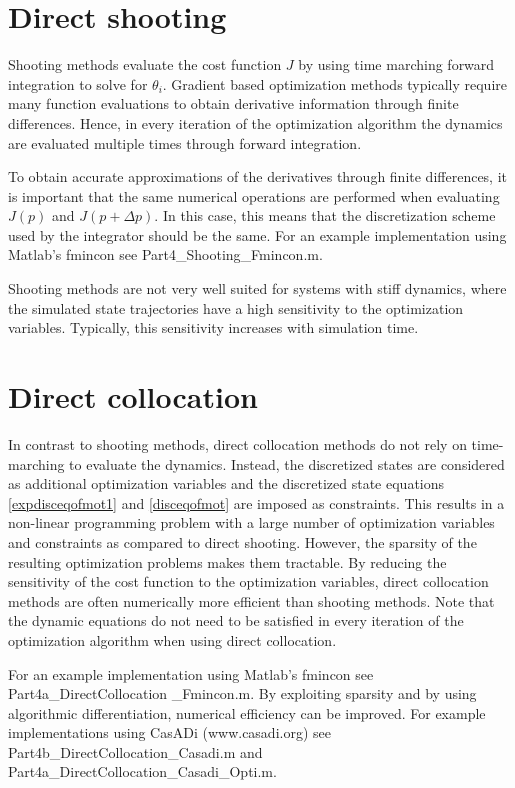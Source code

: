 \documentclass[
a4paper, %
11pt, %
onecolumn, %
openright, %
]{memoir}
\begin{document}
\section{Direct shooting}

Shooting methods evaluate the cost function $J$ by using time marching forward integration to solve for $\theta_i$. Gradient based optimization methods typically require many function evaluations to obtain derivative information through finite differences. Hence, in every iteration of the optimization algorithm the dynamics are evaluated multiple times through forward integration. 

To obtain accurate approximations of the derivatives through finite differences, it is important that the same numerical operations are performed when evaluating $J(p)$ and $J(p+\Delta p)$. In this case, this means that the discretization scheme used by the integrator should be the same. For an example implementation using Matlab's fmincon see Part4\_Shooting\_Fmincon.m.

Shooting methods are not very well suited for systems with stiff dynamics, where the simulated state trajectories have a high sensitivity to the optimization variables. Typically, this sensitivity increases with simulation time.

\section{Direct collocation}

In contrast to shooting methods, direct collocation methods do not rely on time-marching to evaluate the dynamics. Instead, the discretized states are considered as additional optimization variables and the discretized state equations \ref{expdisceqofmot1} and \ref{disceqofmot} are imposed as constraints. This results in a non-linear programming problem with a large number of optimization variables and constraints as compared to direct shooting. However, the sparsity of the resulting optimization problems makes them tractable. By reducing the sensitivity of the cost function to the optimization variables, direct collocation methods are often numerically more efficient than shooting methods. Note that the dynamic equations do not need to be satisfied in every iteration of the optimization algorithm when using direct collocation. 

For an example implementation using Matlab's fmincon see Part4a\_DirectCollocation  \_Fmincon.m. By exploiting sparsity and by using algorithmic differentiation, numerical efficiency can be improved. For example implementations using CasADi (www.casadi.org) see Part4b\_DirectCollocation\_Casadi.m and Part4a\_DirectCollocation\_Casadi\_Opti.m.
\end{document}
